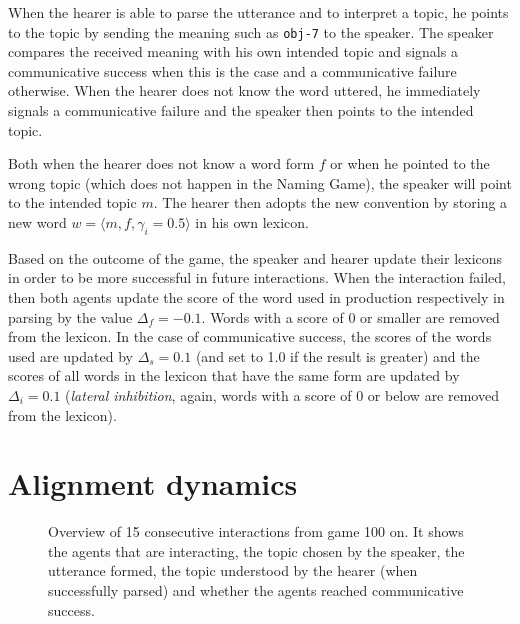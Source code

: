 When the
hearer is able to parse the utterance and to interpret a topic, he
points to the topic by sending the meaning such as \texttt{obj-7} to
the speaker. The speaker compares the received meaning with his own
intended topic and signals a communicative success when this is the
case and a communicative failure otherwise. When the hearer does not
know the word uttered, he immediately signals a communicative failure
and the speaker then points to the intended topic.

 Both when the hearer does not know a word form
$f$ or when he pointed to the wrong topic (which does not happen in
the Naming Game), the speaker will point to the intended topic
$m$. The hearer then adopts the new convention by storing a new word
$w=\langle m, f, \gamma_{i}=0.5\rangle$ in his own lexicon.

 Based on the outcome of the game, the
speaker and hearer update their lexicons in order to be more
successful in future interactions. When the interaction failed, then
both agents update the score of the word used in production
respectively in parsing by the value $\Delta_f = -0.1$. Words with a
score of 0 or smaller are removed from the lexicon. In the case of
communicative success, the scores of the words used are updated by
$\Delta_s = 0.1$ (and set to 1.0 if the result is greater) and the
scores of all words in the lexicon that have the same form are updated
by $\Delta_i = 0.1$ (\emph{lateral inhibition}, again, words with a
score of 0 or below are removed from the lexicon).


\section{Alignment dynamics}


\begin{figure}[t]
  
  \caption{Overview of 15 consecutive interactions from game 100
    on. It shows the agents that are interacting, the topic chosen by
    the speaker, the utterance formed, the topic understood by the
    hearer (when successfully parsed) and whether the agents reached
    communicative success.}
  \label{f:ng-trace}
\end{figure}

